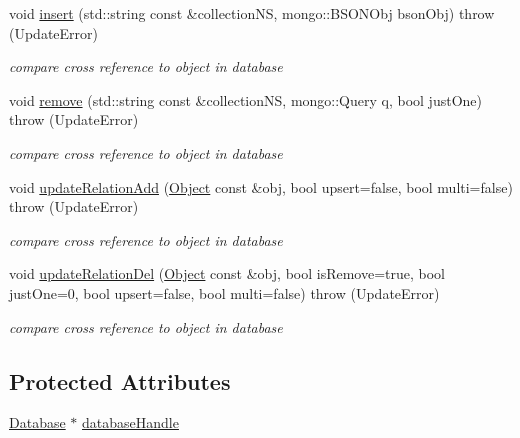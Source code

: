 \begin{DoxyCompactItemize}
void \hyperlink{classunisys_1_1Updater_a99c3e5ade4001d9226945cff25b45680}{insert} (std\-::string const \&collection\-N\-S, mongo\-::\-B\-S\-O\-N\-Obj bson\-Obj)  throw (\-Update\-Error)
\begin{DoxyCompactList}\small\item\em compare cross reference to object in database \end{DoxyCompactList}\item 
void \hyperlink{classunisys_1_1Updater_a4e288baa91e0d8774886f7a89f284ef1}{remove} (std\-::string const \&collection\-N\-S, mongo\-::\-Query q, bool just\-One)  throw (\-Update\-Error)
\begin{DoxyCompactList}\small\item\em compare cross reference to object in database \end{DoxyCompactList}\item 
void \hyperlink{classunisys_1_1Updater_a2af088e6f51a35808623a55a35c36366}{update\-Relation\-Add} (\hyperlink{classunisys_1_1Object}{Object} const \&obj, bool upsert=false, bool multi=false)  throw (\-Update\-Error)
\begin{DoxyCompactList}\small\item\em compare cross reference to object in database \end{DoxyCompactList}\item 
void \hyperlink{classunisys_1_1Updater_a4fc882390d8b42a79b33bc2e533a018d}{update\-Relation\-Del} (\hyperlink{classunisys_1_1Object}{Object} const \&obj, bool is\-Remove=true, bool just\-One=0, bool upsert=false, bool multi=false)  throw (\-Update\-Error)
\begin{DoxyCompactList}\small\item\em compare cross reference to object in database \end{DoxyCompactList}\end{DoxyCompactItemize}
\subsection*{Protected Attributes}
\begin{DoxyCompactItemize}
\item 
\hyperlink{classunisys_1_1Database}{Database} $\ast$ \hyperlink{classunisys_1_1Updater_a9fd851b4b2c640c9ce6adf73aa3570cc}{database\-Handle}
\end{DoxyCompactItemize}


